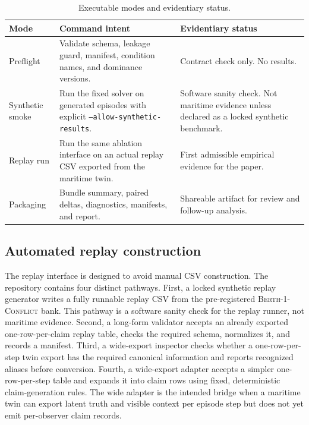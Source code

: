 \documentclass[11pt]{article}
\newcommand{\1}{\mathbf{1}}
\theoremstyle{definition}
\theoremstyle{plain}
\theoremstyle{remark}
\begin{document}
\begin{table}[H]
\centering
\caption{Executable modes and evidentiary status.}
\label{tab:executable-modes}
\small
\begin{tabularx}{\textwidth}{@{}L{0.24\textwidth}L{0.25\textwidth}Y@{}}
\toprule
Mode & Command intent & Evidentiary status \\
\midrule
Preflight & Validate schema, leakage guard, manifest, condition names, and dominance versions. & Contract check only. No results. \\
Synthetic smoke & Run the fixed solver on generated episodes with explicit \texttt{--allow-synthetic-results}. & Software sanity check. Not maritime evidence unless declared as a locked synthetic benchmark. \\
Replay run & Run the same ablation interface on an actual replay CSV exported from the maritime twin. & First admissible empirical evidence for the paper. \\
Packaging & Bundle summary, paired deltas, diagnostics, manifests, and report. & Shareable artifact for review and follow-up analysis. \\
\bottomrule
\end{tabularx}
\end{table}

\subsection{Automated replay construction}
\label{sec:auto-replay}

The replay interface is designed to avoid manual CSV construction. The repository contains four distinct pathways. First, a locked synthetic replay generator writes a fully runnable replay CSV from the pre-registered \textsc{Berth-1-Conflict} bank. This pathway is a software sanity check for the replay runner, not maritime evidence. Second, a long-form validator accepts an already exported one-row-per-claim replay table, checks the required schema, normalizes it, and records a manifest. Third, a wide-export inspector checks whether a one-row-per-step twin export has the required canonical information and reports recognized aliases before conversion. Fourth, a wide-export adapter accepts a simpler one-row-per-step table and expands it into claim rows using fixed, deterministic claim-generation rules. The wide adapter is the intended bridge when a maritime twin can export latent truth and visible context per episode step but does not yet emit per-observer claim records.
\end{document}
